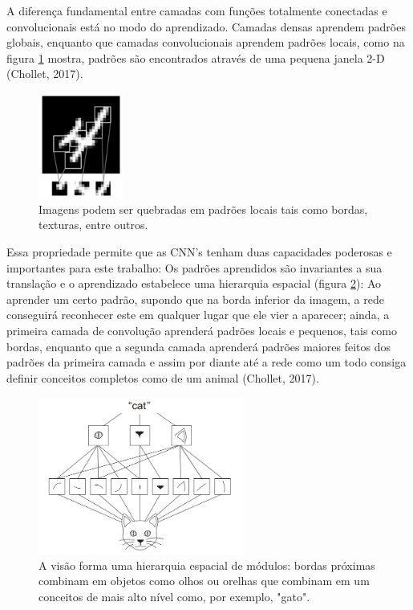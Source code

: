 \documentclass[12pt]{report}
\begin{document}
A diferença fundamental entre camadas com funções totalmente conectadas e convolucionais está no modo do aprendizado. Camadas densas aprendem padrões globais, enquanto que camadas convolucionais aprendem padrões locais, como na figura \ref{fig:quatro} mostra, padrões são encontrados através de uma pequena janela 2-D (Chollet, 2017). 

\begin{figure}
    \centering
    \includegraphics[width=0.25\textwidth]{images/covnet4.png}
    \caption{Imagens podem ser quebradas em padrões locais tais como bordas, texturas, entre outros.}
    \label{fig:quatro}
\end{figure}

Essa propriedade permite que as CNN's tenham duas capacidades poderosas e importantes para este trabalho: Os padrões aprendidos são invariantes a sua translação e o aprendizado estabelece uma hierarquia espacial (figura \ref{fig:gato}): Ao aprender um certo padrão, supondo que na borda inferior da imagem, a rede conseguirá reconhecer este em qualquer lugar que ele vier a aparecer; ainda, a primeira camada de convolução aprenderá padrões locais e pequenos, tais como bordas, enquanto que a segunda camada aprenderá padrões maiores feitos dos padrões da primeira camada e assim por diante até a rede como um todo consiga definir conceitos completos como de um animal (Chollet, 2017).

\begin{figure}
    \centering
    \includegraphics[width=0.6\textwidth]{images/gato.png}
    \caption{A visão forma uma hierarquia espacial de módulos: bordas próximas combinam em objetos como olhos ou orelhas que combinam em um conceitos de mais alto nível como, por exemplo, "gato". }
    \label{fig:gato}
\end{figure}
\end{document}
